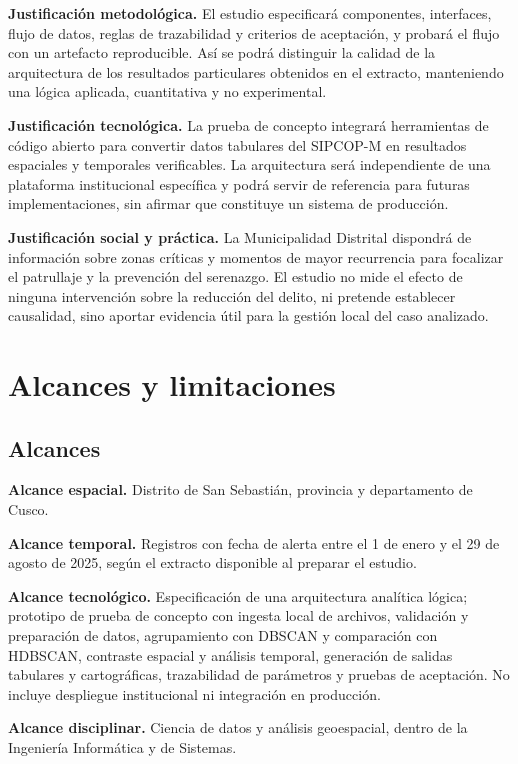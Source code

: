 \textbf{Justificación metodológica.} El estudio especificará componentes, interfaces, flujo de datos, reglas de trazabilidad y criterios de aceptación, y probará el flujo con un artefacto reproducible. Así se podrá distinguir la calidad de la arquitectura de los resultados particulares obtenidos en el extracto, manteniendo una lógica aplicada, cuantitativa y no experimental.

\textbf{Justificación tecnológica.} La prueba de concepto integrará herramientas de código abierto para convertir datos tabulares del SIPCOP-M en resultados espaciales y temporales verificables. La arquitectura será independiente de una plataforma institucional específica y podrá servir de referencia para futuras implementaciones, sin afirmar que constituye un sistema de producción.

\textbf{Justificación social y práctica.} La Municipalidad Distrital dispondrá de información sobre zonas críticas y momentos de mayor recurrencia para focalizar el patrullaje y la prevención del serenazgo. El estudio no mide el efecto de ninguna intervención sobre la reducción del delito, ni pretende establecer causalidad, sino aportar evidencia útil para la gestión local del caso analizado.

\section{Alcances y limitaciones}

\subsection{Alcances}

\textbf{Alcance espacial.} Distrito de San Sebastián, provincia y departamento de Cusco.

\textbf{Alcance temporal.} Registros con fecha de alerta entre el 1 de enero y el 29 de agosto de 2025, según el extracto disponible al preparar el estudio.

\textbf{Alcance tecnológico.} Especificación de una arquitectura analítica lógica; prototipo de prueba de concepto con ingesta local de archivos, validación y preparación de datos, agrupamiento con DBSCAN y comparación con HDBSCAN, contraste espacial y análisis temporal, generación de salidas tabulares y cartográficas, trazabilidad de parámetros y pruebas de aceptación. No incluye despliegue institucional ni integración en producción.

\textbf{Alcance disciplinar.} Ciencia de datos y análisis geoespacial, dentro de la Ingeniería Informática y de Sistemas.

